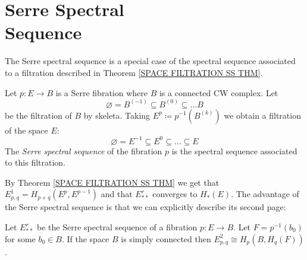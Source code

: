 

\chapter[Serre Spectral Sequence]{Serre Spectral \\ Sequence}
\label{SERRE SPECTRAL SEQUENCE}
\thispagestyle{firststyle}


The Serre spectral sequence is a special case of the spectral sequence
associated to a filtration described in Theorem \ref{SPACE FILTRATION SS THM}. 

\begin{definition}
Let $p\colon E \to B$ is a Serre fibration where $B$ is a connected 
CW complex. Let 
\[
\varnothing = B^{(-1)} \subseteq B^{(0)} \subseteq {\dots} B
\]
be the filtration of $B$ by skeleta. Taking $E^{p} \coloneq p^{-1}(B^{(k)})$ 
we obtain a filtration of the space $E$:
\[ 
\varnothing = E^{-1} \subseteq E^{0} \subseteq {\dots} \subseteq E
\]
The \emph{Serre spectral sequence} of the fibration $p$ is the 
spectral sequence associated to this filtration.
\end{definition}

By Theorem \ref{SPACE FILTRATION SS THM} we get that 
$E^{1}_{p, q} = H_{p+q}(E^{p}, E^{p-1})$ and that $E^{r}_{\ast\ast}$ converges to 
$H_{\ast}(E)$. The advantage of the Serre spectral sequence is that we can 
explicitly describe its second page:

\begin{theorem}
Let $E^{r}_{\ast\ast}$ be the Serre spectral sequence of a fibration $p\colon E\to B$.
Let $F = p^{-1}(b_{0})$ for some $b_{0}\in B$. 
If the space $B$ is simply connected then $E^{2}_{p, q} \cong H_{p}(B, H_{q}(F))$. 
\end{theorem}

